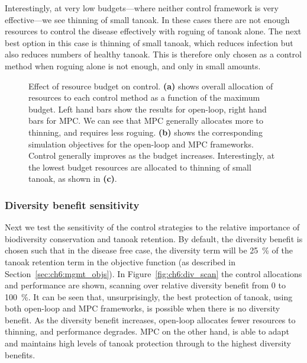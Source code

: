 Interestingly, at very low budgets---where neither control framework is very effective---we see thinning of small tanoak. In these cases there are not enough resources to control the disease effectively with roguing of tanoak alone. The next best option in this case is thinning of small tanoak, which reduces infection but also reduces numbers of healthy tanoak. This is therefore only chosen as a control method when roguing alone is not enough, and only in small amounts.

\begin{figure}[H]
    \begin{center}
        \caption[Varying the control budget]{Effect of resource budget on control. \textbf{(a)} shows overall allocation of resources to each control method as a function of the maximum budget. Left hand bars show the results for open-loop, right hand bars for MPC\@. We can see that MPC generally allocates more to thinning, and requires less roguing. \textbf{(b)} shows the corresponding simulation objectives for the open-loop and MPC frameworks. Control generally improves as the budget increases. Interestingly, at the lowest budget resources are allocated to thinning of small tanoak, as shown in \textbf{(c)}.\label{fig:ch6:budget_scan}}
    \end{center}
\end{figure}

\subsubsection{Diversity benefit sensitivity}\label{sec:ch6:div_scan}

Next we test the sensitivity of the control strategies to the relative importance of biodiversity conservation and tanoak retention. By default, the diversity benefit is chosen such that in the disease free case, the diversity term will be \SI{25}{\percent} of the tanoak retention term in the objective function (as described in Section~\ref{sec:ch6:mgmt_objs}). In Figure~\ref{fig:ch6:div_scan} the control allocations and performance are shown, scanning over relative diversity benefit from 0 to \SI{100}{\percent}. It can be seen that, unsurprisingly, the best protection of tanoak, using both open-loop and MPC frameworks, is possible when there is no diversity benefit. As the diversity benefit increases, open-loop allocates fewer resources to thinning, and performance degrades. MPC on the other hand, is able to adapt and maintains high levels of tanoak protection through to the highest diversity benefits.

